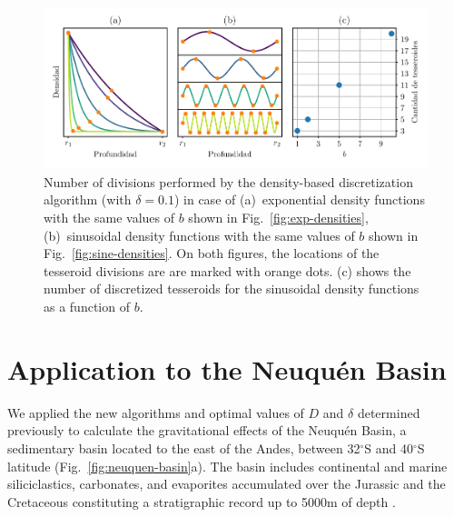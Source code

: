 \documentclass[extra, referee]{gji}
\begin{document}
\begin{figure}
\centering
\includegraphics[width=\linewidth]{figures/number-of-tesseroids.pdf}
\caption{
    Number of divisions performed by the density-based discretization algorithm
    (with $\delta = 0.1$) in case of
    (a)~exponential density functions with the same values of $b$ shown in
    Fig.~\ref{fig:exp-densities},
    (b)~sinusoidal density functions with the same values of $b$ shown in
    Fig.~\ref{fig:sine-densities}.
    On both figures, the locations of the tesseroid divisions are are marked with orange
    dots.
    (c) shows the number of discretized tesseroids for the sinusoidal density functions
    as a function of $b$.
}
\label{fig:number-of-tesseroids}
\end{figure}



\section{Application to the Neuqu\'en Basin}

We applied the new algorithms and optimal values of $D$ and $\delta$ determined
previously to calculate the gravitational effects of the Neuqu\'en Basin,
a sedimentary basin located to the east of the Andes, between 32$^\circ$S and
40$^\circ$S latitude (Fig.~\ref{fig:neuquen-basin}a).
The basin includes continental and marine siliciclastics, carbonates, and evaporites
accumulated over the Jurassic and the Cretaceous constituting a stratigraphic record up
to 5000m of depth \citep{Howell2005}.
\end{document}
